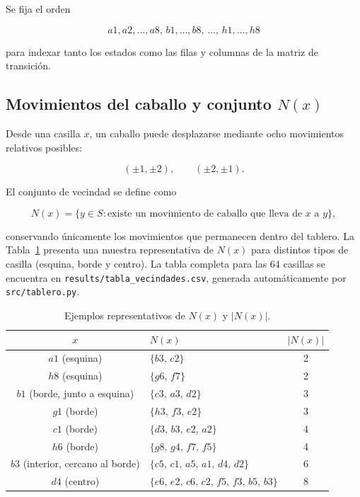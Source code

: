\documentclass[12pt,a4paper]{article}
\begin{document}
Se fija el orden

\[
a1,a2,\ldots,a8,\,b1,\ldots,b8,\,\ldots,\,h1,\ldots,h8
\]

para indexar tanto los estados como las filas y columnas de la matriz
de transición.

\subsection{Movimientos del caballo y conjunto \(N(x)\)}

Desde una casilla \(x\), un caballo puede desplazarse mediante ocho
movimientos relativos posibles:

\[
(\pm1,\pm2),\qquad(\pm2,\pm1).
\]

El conjunto de vecindad se define como

\[
N(x)=\{y\in S: \text{existe un movimiento de caballo que lleva de }x\text{ a }y\},
\]

conservando únicamente los movimientos que permanecen dentro del
tablero. La Tabla~\ref{tab:vecindades-ejemplo} presenta una muestra
representativa de \(N(x)\) para distintos tipos de casilla (esquina,
borde y centro). La tabla completa para las 64 casillas se encuentra
en \texttt{results/tabla\_vecindades.csv}, generada automáticamente
por \texttt{src/tablero.py}.

\begin{table}[H]
\centering
\caption{Ejemplos representativos de \(N(x)\) y \(|N(x)|\).}
\label{tab:vecindades-ejemplo}

\begin{tabular}{clc}
\toprule
\(x\) & \(N(x)\) & \(|N(x)|\) \\
\midrule
\(a1\) (esquina) & \(\{b3,\,c2\}\) & 2 \\
\(h8\) (esquina) & \(\{g6,\,f7\}\) & 2 \\
\(b1\) (borde, junto a esquina) & \(\{c3,\,a3,\,d2\}\) & 3 \\
\(g1\) (borde) & \(\{h3,\,f3,\,e2\}\) & 3 \\
\(c1\) (borde) & \(\{d3,\,b3,\,e2,\,a2\}\) & 4 \\
\(h6\) (borde) & \(\{g8,\,g4,\,f7,\,f5\}\) & 4 \\
\(b3\) (interior, cercano al borde) & \(\{c5,\,c1,\,a5,\,a1,\,d4,\,d2\}\) & 6 \\
\(d4\) (centro) & \(\{e6,\,e2,\,c6,\,c2,\,f5,\,f3,\,b5,\,b3\}\) & 8 \\
\bottomrule
\end{tabular}

\end{table}
\end{document}

